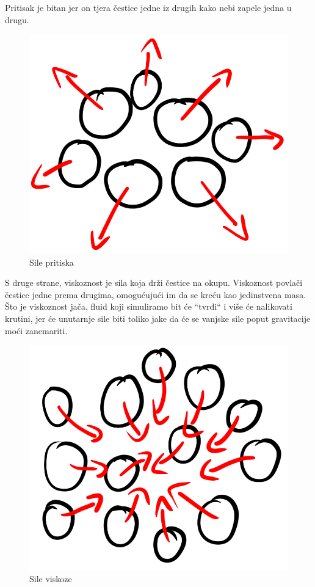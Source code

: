 \documentclass[diplomskirad]{fer}
\begin{document}
    Pritisak je bitan jer on tjera čestice jedne iz drugih kako nebi zapele jedna u drugu.
    \begin{figure}[H]
        \centering
        \includegraphics[scale=1]{images/pressureForce}
        \caption{
            Sile pritiska
        }
        \label{fig:pressureForce}
    \end{figure}

    \newpage
    S druge strane, viskoznost je sila koja drži čestice na okupu.
    Viskoznost povlači čestice jedne prema drugima, omogućujući im da se kreću kao jedinstvena masa.
    Što je viskoznost jača, fluid koji simuliramo bit će ``tvrđi`` i više će nalikovati krutini, jer će unutarnje sile biti toliko jake da će se vanjske sile poput gravitacije moći zanemariti.
    \begin{figure}[H]
        \centering
        \includegraphics[scale=1]{images/viscoseForce}
        \caption{
            Sile viskoze
        }
        \label{fig:viscoseForce}
    \end{figure}
\end{document}
